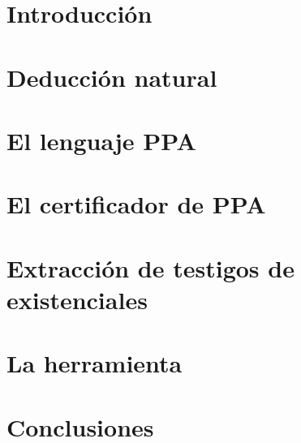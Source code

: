 \documentclass[11pt,a4paper]{tesis}
\begin{document}

\def\autor{Manuel Panichelli}
\def\tituloTesis{
PPA - Un asistente de demostración para lógica de primer orden con extracción de
testigos usando la traducción de Friedman
}
\def\runtitulo{PPA - Un asistente de demostración para lógica de primer orden
con extracción de testigos usando la traducción de Friedman}
\def\runtitle{PPA - a proof-assistant for first-order logic with witness extraction using Friedman's translation}
\def\director{Pablo Barenbaum}
\def\lugar{Buenos Aires, 2024}



\frontmatter
\pagestyle{empty}


\cleardoublepage


\cleardoublepage


\cleardoublepage
\tableofcontents

\mainmatter
\pagestyle{headings}


\chapter{Introducción}



\chapter{Deducción natural}
\label{chap:nd}



\chapter{El lenguaje PPA}
\label{chap:ppa}



\chapter{El certificador de PPA}
\label{chap:ppa-certifier}



\chapter{Extracción de testigos de existenciales}
\label{chap:witness-extraction}



\chapter{La herramienta \ppaTool}
\label{chap:ppa-tool}



\chapter{Conclusiones}



\backmatter
\printbibliography
\end{document}
